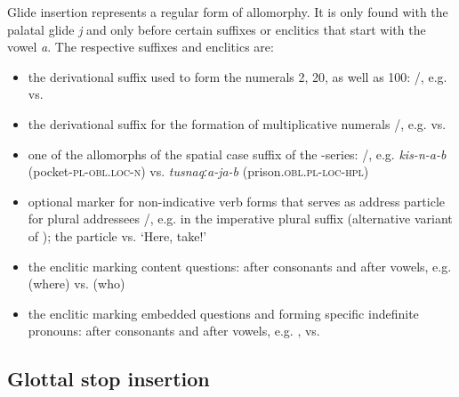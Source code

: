 Glide insertion represents a regular form of allomorphy. It is only found with the palatal glide \textit{j} and only before certain suffixes or enclitics that start with the vowel \textit{a}. The respective suffixes and enclitics are:
%
\begin{itemize}
	\item	the derivational suffix used to form the numerals 2, 20, as well as 100: \slash{}, e.g.   vs.   
	\item	the derivational suffix  for the formation of multiplicative numerals \slash{}, e.g.   vs.  
	\item	one of the allomorphs of the spatial case suffix of the -series: \slash{}, e.g. \textit{kis-n-a-b}  (pocket-\textsc{pl}-\textsc{obl}.\textsc{loc}-\textsc{n}) vs. \textit{tusnaqːa-ja-b}  (prison.\textsc{obl.pl-loc-hpl}) 
	\item	optional marker for non-indicative verb forms that  serves as address particle for plural addressees \slash{}, e.g. in the imperative plural suffix  (alternative variant of ); the particle  vs.  `Here, take!'
	\item	the enclitic marking content questions:  after consonants and  after vowels, e.g.   (where) vs.   (who)
	\item	the enclitic marking embedded questions and forming specific indefinite pronouns:  after consonants and  after vowels, e.g.  , 	 vs.   
\end{itemize}



\subsection{Glottal stop insertion}
\label{ssec:Glottal stop insertion}

